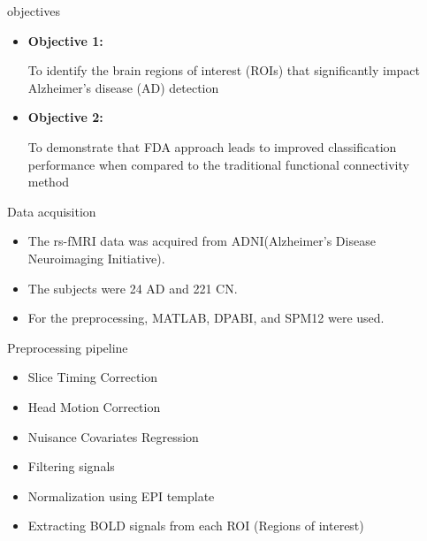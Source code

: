 \documentclass[final]{beamer}
\newlength{\colwidth}
\begin{document}
\begin{frame}[t]
\begin{columns}[t]
\begin{column}{\colwidth}
  \begin{alertblock}{objectives}
    \begin{itemize}
      \item \textbf{Objective 1:}

      To identify the brain regions of interest (ROIs) that significantly impact Alzheimer's disease (AD) detection
      
      \item \textbf{Objective 2:} 
      
      To demonstrate that FDA approach leads to improved classification performance when compared to the traditional functional connectivity method
      
    \end{itemize}

  \end{alertblock}





\begin{block}{Data acquisition}
  \begin{itemize}
    \item The rs-fMRI data was acquired from ADNI(Alzheimer's Disease Neuroimaging Initiative).
    \item The subjects were 24 AD and 221 CN.
    \item For the preprocessing, MATLAB, DPABI, and SPM12 were used.
  \end{itemize} 


    \begin{exampleblock}{Preprocessing pipeline}
        \begin{itemize}
            \item Slice Timing Correction
            \item Head Motion Correction
            \item Nuisance Covariates Regression
            \item Filtering signals
            \item Normalization using EPI template
            \item Extracting BOLD signals from each ROI (Regions of interest)
        \end{itemize}
    \end{exampleblock}



\end{block}
\end{column}
\end{columns}
\end{frame}
\end{document}
